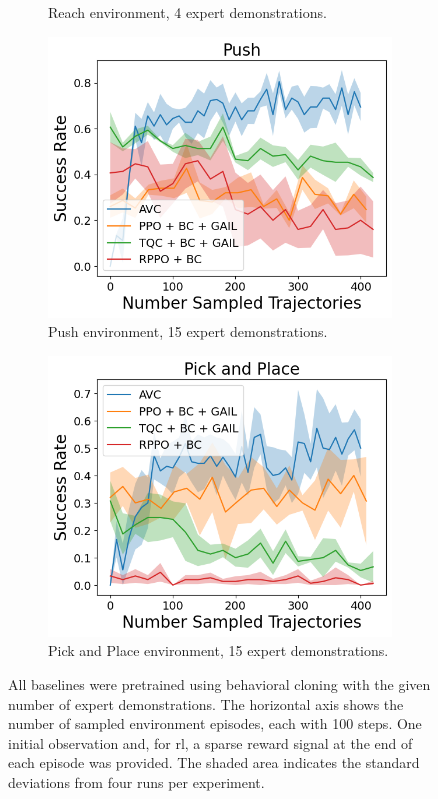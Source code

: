 \begin{figure}[htbp]
\begin{subfigure}[t]{0.45\textwidth}
    \caption{Reach environment, 4 expert demonstrations.}
  \end{subfigure}
  \medskip
  \begin{subfigure}[t]{0.45\textwidth}
    \includegraphics[width=\textwidth]{images/15_400/Push.png}
    \caption{Push environment, 15 expert demonstrations.}
  \end{subfigure}
  \begin{subfigure}[t]{0.45\textwidth}
    \includegraphics[width=\textwidth]{images/15_400/Pick and Place.png}
    \caption{Pick and Place environment, 15 expert demonstrations.}
  \end{subfigure}
  \caption{
    All baselines were pretrained using behavioral cloning with the given number of expert demonstrations. 
    The horizontal axis shows the number of sampled environment episodes, each with 100 steps. 
    One initial observation and, for \ac{rl}, a sparse reward signal at the end of each episode was provided. 
    The shaded area indicates the standard deviations from four runs per experiment.}
    \label{fig:finetuning}
\end{figure}

